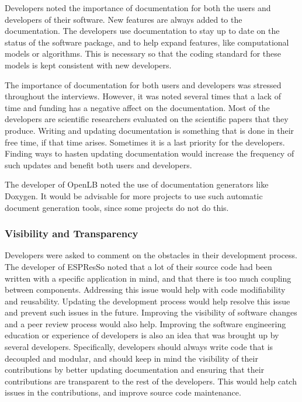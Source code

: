 \documentclass[12pt, notitlepage]{article}
\begin{document}
Developers noted the importance of documentation for both the users and developers of their software. New features are always added to the documentation. The developers use documentation to stay up to date on the status of the software package, and to help expand features, like computational models or algorithms. This is necessary so that the coding standard for these models is kept consistent with new developers.

The importance of documentation for both users and developers was stressed throughout the interviews. However, it was noted several times that a lack of time and funding has a negative affect on the documentation. Most of the developers are scientific researchers evaluated on the scientific papers that they produce. Writing and updating documentation is something that is done in their free time, if that time arises. Sometimes it is a last priority for the developers. Finding ways to hasten updating documentation would increase the frequency of such updates and benefit both users and developers. 

The developer of OpenLB noted the use of documentation generators like Doxygen. It would be advisable for more projects to use such automatic document generation tools, since some projects do not do this.  

\subsubsection{Visibility and Transparency}

Developers were asked to comment on the obstacles in their development process. The developer of ESPResSo noted that a lot of their source code had been written with a specific application in mind, and that there is too much coupling between components. Addressing this issue would help with code modifiability and reusability. Updating the development process would help resolve this issue and prevent such issues in the future. Improving the visibility of software changes and a peer review process would also help. Improving the software engineering education or experience of developers is also an idea that was brought up by several developers. Specifically, developers should always write code that is decoupled and modular, and should keep in mind the visibility of their contributions by better updating documentation and ensuring that their contributions are transparent to the rest of the developers. This would help catch issues in the contributions, and improve source code maintenance.   
\end{document}
